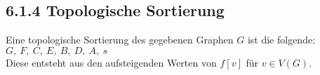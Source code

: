 \subsection*{6.1.4 Topologische Sortierung}
Eine topologische Sortierung des gegebenen Graphen $G$ ist die folgende:\\
$G,\ F,\ C,\ E,\ B,\ D,\ A,\ s$\\
Diese entsteht aus den aufsteigenden Werten von $f[v]$ für $v \in V(G)$.
